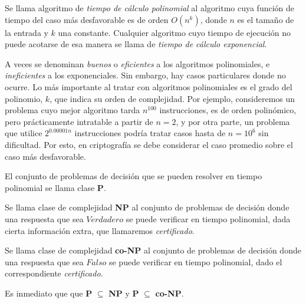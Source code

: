 \begin{definition}
	Se llama algoritmo de \textit{tiempo de cálculo polinomial} al algoritmo cuya función de tiempo del caso más desfavorable es de orden $O(n^k)$, donde $n$ es el tamaño de la entrada y $k$ una constante. Cualquier algoritmo cuyo tiempo de ejecución no puede acotarse de esa manera se llama de \textit{tiempo de cálculo exponencial}.
\end{definition}

A veces se denominan \textit{buenos} o \textit{eficientes} a los algoritmos polinomiales, e \textit{ineficientes} a los exponenciales. Sin embargo, hay casos particulares donde no ocurre. Lo más importante al tratar con algoritmos polinomiales es el grado del polinomio, $k$, que indica su orden de complejidad. Por ejemplo, consideremos un problema cuyo mejor algoritmo tarda $n^{100}$ instrucciones, es de orden polinómico, pero prácticamente intratable a partir de $n=2$, y por otra parte, un problema que utilice $2^{0.00001n}$ instrucciones podría tratar casos hasta de $n=10^6$ sin dificultad.
Por esto, en criptografía se debe considerar el caso promedio sobre el caso más desfavorable.


\begin{definition}
	El conjunto de problemas de decisión que se pueden resolver en tiempo polinomial se llama clase \textbf{P}.
\end{definition}

\begin{definition}
	Se llama clase de complejidad \textbf{NP} al conjunto de problemas de decisión donde una respuesta que sea $Verdadero$ se puede verificar en tiempo polinomial, dada cierta información extra, que llamaremos \textit{certificado}.
	\label{def:NP}
\end{definition}

\begin{definition}
	Se llama clase de complejidad \textbf{co-NP} al conjunto de problemas de decisión donde una respuesta que sea $Falso$ se puede verificar en tiempo polinomial, dado el correspondiente \textit{certificado}.
\end{definition}

Es inmediato que  que \textbf{P} $\subseteq$ \textbf{NP} y \textbf{P} $\subseteq$ \textbf{co-NP}.

